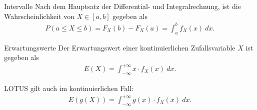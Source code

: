\documentclass{beamer}
\def\padding{\vspace{0.5cm}}
\begin{document}
\begin{frame}
    \begin{block}{Intervalle}
        Nach dem Hauptsatz der Differential- und Integralrechnung, ist die Wahrscheinlichkeit von $X \in [a,b]$ gegeben als
        \begin{align*}
            P(a \leq X \leq b) = F_X(b) - F_X(a) = \int_a^b f_X(x)\ dx.
        \end{align*}
    \end{block}
\end{frame}

\begin{frame}
    \begin{block}{Erwartungswerte}
        Der Erwartungswert einer kontinuierlichen Zufallsvariable $X$ ist gegeben als
        \begin{align*}
            E(X) = \int_{- \infty}^{+ \infty} x \cdot f_X(x)\ dx.
        \end{align*}\pause\par\padding
        LOTUS gilt auch im kontinuierlichen Fall:
        \begin{align*}
            E(g(X)) = \int_{- \infty}^{+ \infty} g(x) \cdot f_X(x)\ dx.
        \end{align*}
    \end{block}
\end{frame}
\end{document}
